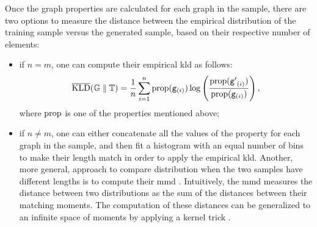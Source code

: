 Once the graph properties are calculated for each graph in the sample, there are two options to measure the distance between the empirical distribution of the training sample versus the generated sample, based on their respective number of elements:
\begin{itemize}
    \item if $n = m$, one can compute their empirical \gls{kld} as follows:
    $$\overline{\mathrm{KLD}}(\mathbb{G} \;\Vert\; \mathbb{T}) = \frac{1}{n} \sum_{i=1}^{n} \mathrm{prop}(\mathtt{g}_{(i)}) \log \left( \frac{\mathrm{prop}(\mathtt{g'}_{(i)})}{\mathrm{prop}(\mathtt{g}_{(i)})} \right),$$
    where $\mathrm{prop}$ is one of the properties mentioned above;
    \item if $n \neq m$, one can either concatenate all the values of the property for each graph in the sample, and then fit a histogram with an equal number of bins to make their length match in order to apply the empirical \gls{kld}. Another, more general, approach to compare distribution when the two samples have different lengths is to compute their \gls{mmd} \citep{gretton2012mmdkernel}. Intuitively, the \gls{mmd} measures the distance between two distributions as the sum of the distances between their matching moments. The computation of these distances can be generalized to an infinite space of moments by applying a kernel trick \citep{smola2008kernels}.
\end{itemize}